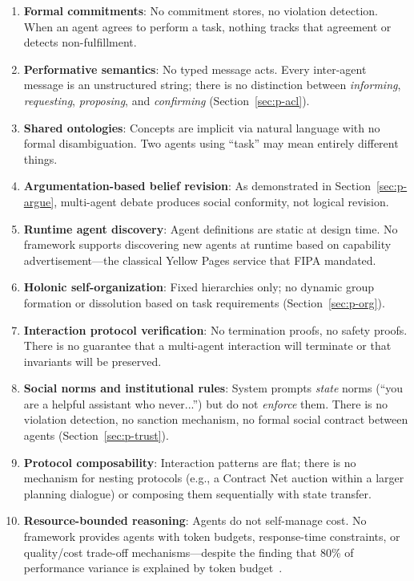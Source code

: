 \documentclass{article}
\begin{document}
\begin{enumerate}[nosep, label=\textbf{\arabic*.}]
  \item \textbf{Formal commitments}: No commitment stores, no violation detection. When
    an agent agrees to perform a task, nothing tracks that agreement or detects
    non-fulfillment.
  \item \textbf{Performative semantics}: No typed message acts. Every inter-agent message
    is an unstructured string; there is no distinction between \emph{informing},
    \emph{requesting}, \emph{proposing}, and \emph{confirming}
    (Section~\ref{sec:p-acl}).
  \item \textbf{Shared ontologies}: Concepts are implicit via natural language with no
    formal disambiguation. Two agents using ``task'' may mean entirely different things.
  \item \textbf{Argumentation-based belief revision}: As demonstrated in
    Section~\ref{sec:p-argue}, multi-agent debate produces social conformity, not
    logical revision.
  \item \textbf{Runtime agent discovery}: Agent definitions are static at design time.
    No framework supports discovering new agents at runtime based on capability
    advertisement---the classical Yellow Pages service that FIPA mandated.
  \item \textbf{Holonic self-organization}: Fixed hierarchies only; no dynamic group
    formation or dissolution based on task requirements
    (Section~\ref{sec:p-org}).
  \item \textbf{Interaction protocol verification}: No termination proofs, no safety
    proofs. There is no guarantee that a multi-agent interaction will terminate or
    that invariants will be preserved.
  \item \textbf{Social norms and institutional rules}: System prompts \emph{state} norms
    (``you are a helpful assistant who never...'') but do not \emph{enforce} them. There
    is no violation detection, no sanction mechanism, no formal social contract between
    agents (Section~\ref{sec:p-trust}).
  \item \textbf{Protocol composability}: Interaction patterns are flat; there is no
    mechanism for nesting protocols (e.g., a Contract Net auction within a larger
    planning dialogue) or composing them sequentially with state transfer.
  \item \textbf{Resource-bounded reasoning}: Agents do not self-manage cost. No framework
    provides agents with token budgets, response-time constraints, or quality/cost
    trade-off mechanisms---despite the finding that 80\% of performance variance is
    explained by token budget~\citep{anthropic2025building}.
\end{enumerate}
\end{document}
